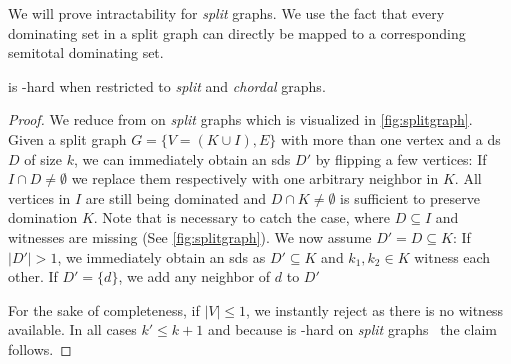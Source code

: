 We will prove intractability for \textit{split} graphs. 
We use the fact that every dominating set in a split graph can directly be mapped to a corresponding semitotal dominating set.

\begin{theorem}\label{lemma:splitgraph}
    \sdom is \WONEhs-hard when restricted to \textit{split} and \textit{chordal} graphs.
\end{theorem}

\begin{proof}

    We reduce from \dom on \textit{split} graphs which is visualized in \cref{fig:splitgraph}.
    Given a split graph $G = \{V = (K \cup I), E\}$ with more than one vertex and a ds $D$ of size $k$, we can immediately obtain an sds $D'$ by flipping a few vertices:
    If $I \cap D \neq \emptyset$ we replace them respectively with one arbitrary neighbor in $K$.
    All vertices in $I$ are still being dominated and $D \cap K \neq \emptyset$ is sufficient to preserve domination $K$. 
    Note that is necessary to catch the case, where $D \subseteq I$ and witnesses are missing (See \cref{fig:splitgraph}).
    We now assume $D' = D \subseteq K$:
    If $|D'| > 1$, we immediately obtain an sds as $D' \subseteq K$ and $k_1,k_2\in K$ witness each other.
    If $D' = \{d\}$, we add any neighbor of $d$ to $D'$
    
    For the sake of completeness, if $|V| \leq 1$, we instantly reject as there is no witness available.
    In all cases $k' \leq k + 1$ and because \dom is \WTWOhs-hard on \textit{split} graphs~\cite{Raman2008} the claim follows.

%    


\end{proof}

